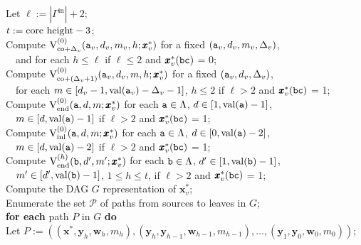 \documentclass[12pt]{article}
\newcommand{\inn}{\mathrm{in}}
\newcommand{\co}{\mathrm{co}}
\newcommand{\V}{{\rm V}}
\newcommand{\ta}{{\tt a}}
\newcommand{\tb}{{\tt b}}
\newcommand{\w}{\pmb{w}}
\newcommand{\y}{\pmb{y}}
\newcommand{\x}{\pmb{x}}
\newcommand{\1}{\pmb{1}}
\newcommand{\0}{\pmb{0}}
\newcommand{\val}{\mathrm{val}}
\newcommand{\inl}{\mathrm{inl}}
\newcommand{\en}{\mathrm{end}}
\begin{document}
\begin{tabbing}
Let $\ell:= |\Gamma^{\inn}| + 2$;\\
$t : = {\rm core~height} -3$;\\
	Compute $\V^{(0)}_{\co + \Delta_v}
	(\ta_v, d_v, m_v, h; \x^*_v)$ for a fixed 
	$(\ta_v, d_v, m_v, \Delta_v)$, \\
	~~and for each 
	$h \leq \ell  $ if 
	$\ell \leq 2$ and $\x^*_v(\tt bc)$ = 0;\\
	Compute $\V^{(0)}_{\co + (\Delta_v + 1)}
	(\ta_v, d_v, m, h; \x^*_v)$ for a fixed 
	$(\ta_v, d_v, \Delta_v)$, \\
	~~for each $m \in [d_v -1, \val(\ta_v) - \Delta_v -1]$, 
	$h \leq 2$ if 
	$\ell > 2$ and $\x^*_v(\tt bc)$ = 1;\\
	Compute 
	$\V_{\en}^{(0)}(\ta, d, m; \x^*_v)$ for each 
$\ta \in \Lambda$, $d \in [1, \val(\ta)-1]$, \\
~~$m \in [d, \val(\ta)-1]$ if 
	$\ell > 2$ and $\x^*_v(\tt bc)$ = 1;\\
	Compute $\V_{\inl}^{(0)}(\ta, d, m; \x^*_v)$ for each 
	$\ta \in \Lambda$, $d \in [0, \val(\ta)-2]$, \\
~~$m \in [d, \val(\ta)-2]$
	if 
	$\ell > 2$ and $\x^*_v(\tt bc)$ = 1;\\
	Compute 
	$\V_{\en}^{(h)}(\tb, d', m'; \x^*_v)$ for each 
$\tb \in \Lambda$, $d' \in [1, \val(\tb)-1]$, \\
~~$m' \in [d', \val(\tb)-1]$, $1 \leq h \leq t$, 
     if 
	$\ell > 2$ and $\x^*_v(\tt bc)$ = 1;\\
Compute the DAG $G$ representation of $\x^*_v$;\\
Enumerate the set $\mathcal{P}$ of paths 
from sources to leaves in $G$;\\
{\bf for each} path $P$ in $G$ {\bf do}\+ \\
 Let $P := ((\x^*, \y_h, \w_h, m_h), (\y_h, \y_{h-1}, \w_{h-1}, m_{h-1}), \ldots, (\y_1, \y_{0}, \w_{0}, m_{0}))$;\\

\end{tabbing}
\end{document}
